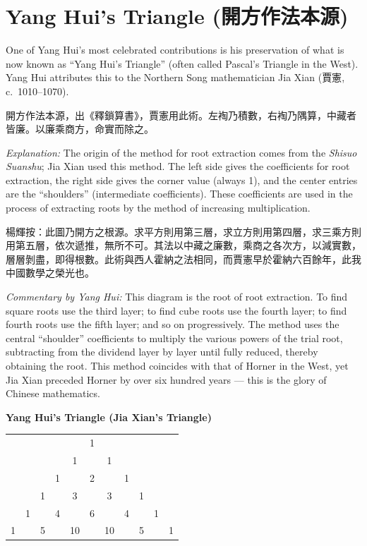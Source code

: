 \documentclass[11pt,a4paper]{article}
\newcommand{\zh}[1]{{#1}}
\newenvironment{chpassage}{%
  \par\medskip
  \begin{center}
  \begin{minipage}{0.95\textwidth}
  \setlength{\parindent}{2em}
  \linespread{1.3}\selectfont
}{%
  \end{minipage}
  \end{center}
  \medskip
}
\begin{document}
\newpage

\section{Yang Hui's Triangle (\zh{開方作法本源})}
\label{sec:triangle}

One of Yang Hui's most celebrated contributions is his preservation of what is
now known as ``Yang Hui's Triangle'' (often called Pascal's Triangle in the
West). Yang Hui attributes this to the Northern Song mathematician Jia Xian
(\zh{賈憲}, c.~1010--1070).

\begin{chpassage}
\zh{開方作法本源，出《釋鎖算書》，賈憲用此術。左裪乃積數，右裪乃隅算，中藏者皆廉。以廉乘商方，命實而除之。}

\medskip
\textit{Explanation:} The origin of the method for root extraction comes from
the \textit{Shisuo Suanshu}; Jia Xian used this method. The left side gives
the coefficients for root extraction, the right side gives the corner value
(always 1), and the center entries are the ``shoulders'' (intermediate
coefficients). These coefficients are used in the process of extracting roots
by the method of increasing multiplication.
\end{chpassage}

\begin{chpassage}
\zh{楊輝按：此圖乃開方之根源。求平方則用第三層，求立方則用第四層，求三乘方則用第五層，依次遞推，無所不可。其法以中藏之廉數，乘商之各次方，以減實數，層層剝盡，即得根數。此術與西人霍納之法相同，而賈憲早於霍納六百餘年，此我中國數學之榮光也。}

\medskip
\textit{Commentary by Yang Hui:} This diagram is the root of root extraction.
To find square roots use the third layer; to find cube roots use the fourth
layer; to find fourth roots use the fifth layer; and so on progressively. The
method uses the central ``shoulder'' coefficients to multiply the various
powers of the trial root, subtracting from the dividend layer by layer until
fully reduced, thereby obtaining the root. This method coincides with that of
Horner in the West, yet Jia Xian preceded Horner by over six hundred years ---
this is the glory of Chinese mathematics.
\end{chpassage}

\begin{center}
\textbf{Yang Hui's Triangle (Jia Xian's Triangle)}
\vspace{0.5cm}

\begin{tabular}{ccccccccccc}
 & & & & & 1 & & & & & \\
 & & & & 1 & & 1 & & & & \\
 & & & 1 & & 2 & & 1 & & & \\
 & & 1 & & 3 & & 3 & & 1 & & \\
 & 1 & & 4 & & 6 & & 4 & & 1 & \\
 1 & & 5 & & 10 & & 10 & & 5 & & 1 \\
\end{tabular}
\end{center}
\end{document}
